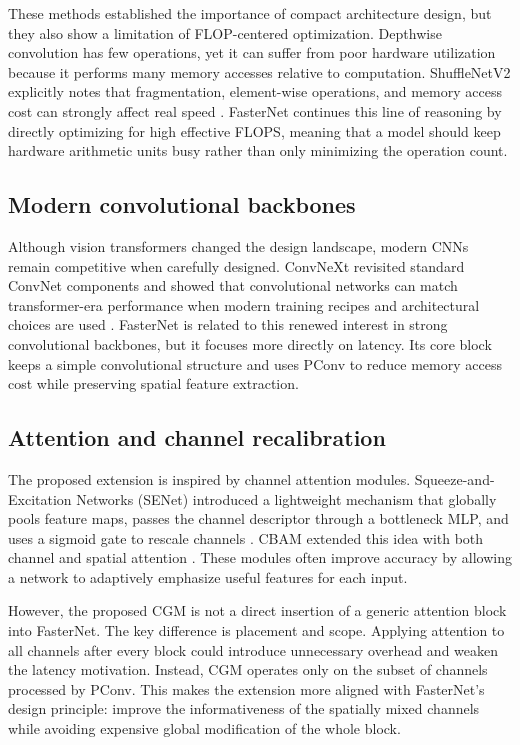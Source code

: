 \documentclass{article}
\begin{document}
These methods established the importance of compact architecture design, but they also show a limitation of FLOP-centered optimization. Depthwise convolution has few operations, yet it can suffer from poor hardware utilization because it performs many memory accesses relative to computation. ShuffleNetV2 explicitly notes that fragmentation, element-wise operations, and memory access cost can strongly affect real speed \citep{ma2018shufflenetv2}. FasterNet continues this line of reasoning by directly optimizing for high effective FLOPS, meaning that a model should keep hardware arithmetic units busy rather than only minimizing the operation count.

\subsection{Modern convolutional backbones}

Although vision transformers changed the design landscape, modern CNNs remain competitive when carefully designed. ConvNeXt revisited standard ConvNet components and showed that convolutional networks can match transformer-era performance when modern training recipes and architectural choices are used \citep{liu2022convnext}. FasterNet is related to this renewed interest in strong convolutional backbones, but it focuses more directly on latency. Its core block keeps a simple convolutional structure and uses PConv to reduce memory access cost while preserving spatial feature extraction.

\subsection{Attention and channel recalibration}

The proposed extension is inspired by channel attention modules. Squeeze-and-Excitation Networks (SENet) introduced a lightweight mechanism that globally pools feature maps, passes the channel descriptor through a bottleneck MLP, and uses a sigmoid gate to rescale channels \citep{hu2018senet}. CBAM extended this idea with both channel and spatial attention \citep{woo2018cbam}. These modules often improve accuracy by allowing a network to adaptively emphasize useful features for each input.

However, the proposed CGM is not a direct insertion of a generic attention block into FasterNet. The key difference is placement and scope. Applying attention to all channels after every block could introduce unnecessary overhead and weaken the latency motivation. Instead, CGM operates only on the subset of channels processed by PConv. This makes the extension more aligned with FasterNet's design principle: improve the informativeness of the spatially mixed channels while avoiding expensive global modification of the whole block.
\end{document}
